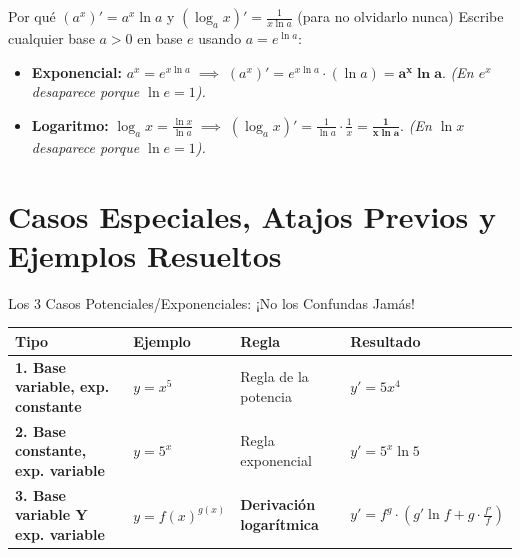 \documentclass[10pt,a4paper]{article}
\begin{document}
\begin{trucobox}{Por qué $(a^x)' = a^x \ln a$ y $(\log_a x)' = \frac{1}{x \ln a}$ (para no olvidarlo nunca)}
Escribe cualquier base $a > 0$ en base $e$ usando $a = e^{\ln a}$:
\begin{itemize}\itemsep 1pt
  \item \textbf{Exponencial:} $a^x = e^{x\ln a} \;\implies\; (a^x)' = e^{x\ln a}\cdot (\ln a) = \mathbf{a^x \ln a}$. \textit{(En $e^x$ desaparece porque $\ln e = 1$).}
  \item \textbf{Logaritmo:} $\log_a x = \frac{\ln x}{\ln a} \;\implies\; (\log_a x)' = \frac{1}{\ln a}\cdot\frac{1}{x} = \mathbf{\frac{1}{x\ln a}}$. \textit{(En $\ln x$ desaparece porque $\ln e = 1$).}
\end{itemize}
\end{trucobox}

\newpage

\section*{Casos Especiales, Atajos Previos y Ejemplos Resueltos}

\begin{formulabox}{Los 3 Casos Potenciales/Exponenciales: ¡No los Confundas Jamás!}
\renewcommand{\arraystretch}{1.35}
\small
\begin{tabularx}{\linewidth}{@{}l l l X@{}}
\toprule
\textbf{Tipo} & \textbf{Ejemplo} & \textbf{Regla} & \textbf{Resultado} \\
\midrule
\textbf{1. Base variable, exp. constante} & $y = x^5$ & Regla de la potencia & $y' = 5x^4$ \\
\textbf{2. Base constante, exp. variable} & $y = 5^x$ & Regla exponencial & $y' = 5^x \ln 5$ \\
\textbf{3. Base variable Y exp. variable} & $y = f(x)^{g(x)}$ & \textbf{Derivación logarítmica} & $\displaystyle y' = f^g \cdot \left(g'\ln f + g\cdot\frac{f'}{f}\right)$ \\
\bottomrule
\end{tabularx}
\end{formulabox}
\end{document}
